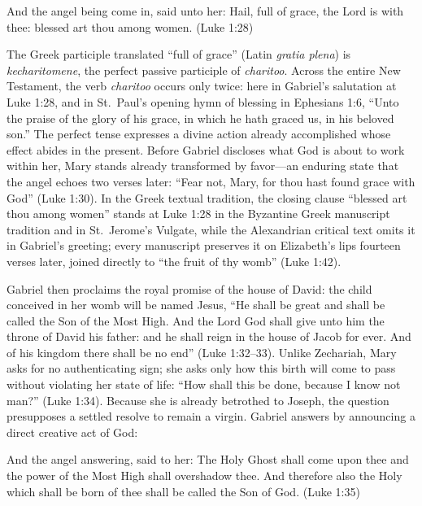 \begin{scriptureblock}
And the angel being come in, said unto her: Hail, full of grace, the Lord is with thee: blessed art thou among women. \textnormal{(Luke 1:28)}
\end{scriptureblock}

The Greek participle translated ``full of grace'' (Latin \textit{gratia plena}) is \textit{kecharitomene}, the perfect passive participle of \textit{charitoo}. Across the entire New Testament, the verb \textit{charitoo} occurs only twice: here in Gabriel's salutation at Luke 1:28, and in St.\ Paul's opening hymn of blessing in Ephesians 1:6, ``Unto the praise of the glory of his grace, in which he hath graced us, in his beloved son.'' The perfect tense expresses a divine action already accomplished whose effect abides in the present. Before Gabriel discloses what God is about to work within her, Mary stands already transformed by favor---an enduring state that the angel echoes two verses later: ``Fear not, Mary, for thou hast found grace with God'' (Luke 1:30). In the Greek textual tradition, the closing clause ``blessed art thou among women'' stands at Luke 1:28 in the Byzantine Greek manuscript tradition and in St.\ Jerome's Vulgate, while the Alexandrian critical text omits it in Gabriel's greeting; every manuscript preserves it on Elizabeth's lips fourteen verses later, joined directly to ``the fruit of thy womb'' (Luke 1:42).

Gabriel then proclaims the royal promise of the house of David: the child conceived in her womb will be named Jesus, ``He shall be great and shall be called the Son of the Most High. And the Lord God shall give unto him the throne of David his father: and he shall reign in the house of Jacob for ever. And of his kingdom there shall be no end'' (Luke 1:32--33). Unlike Zechariah, Mary asks for no authenticating sign; she asks only how this birth will come to pass without violating her state of life: ``How shall this be done, because I know not man?'' (Luke 1:34). Because she is already betrothed to Joseph, the question presupposes a settled resolve to remain a virgin. Gabriel answers by announcing a direct creative act of God:

\begin{scriptureblock}
And the angel answering, said to her: The Holy Ghost shall come upon thee and the power of the Most High shall overshadow thee. And therefore also the Holy which shall be born of thee shall be called the Son of God. \textnormal{(Luke 1:35)}
\end{scriptureblock}

